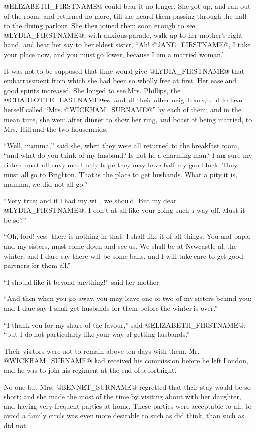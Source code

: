 @ELIZABETH_FIRSTNAME@ could bear it no longer. She got up, and ran out of the room;
and returned no more, till she heard them passing through the hall to
the dining parlour. She then joined them soon enough to see @LYDIA_FIRSTNAME@, with
anxious parade, walk up to her mother's right hand, and hear her say
to her eldest sister, ``Ah! @JANE_FIRSTNAME@, I take your place now, and you must go
lower, because I am a married woman.''

It was not to be supposed that time would give @LYDIA_FIRSTNAME@ that embarrassment
from which she had been so wholly free at first. Her ease and good
spirits increased. She longed to see Mrs. Phillips, the @CHARLOTTE_LASTNAME@es, and
all their other neighbours, and to hear herself called ``Mrs. @WICKHAM_SURNAME@''
by each of them; and in the mean time, she went after dinner to show her
ring, and boast of being married, to Mrs. Hill and the two housemaids.

``Well, mamma,'' said she, when they were all returned to the breakfast
room, ``and what do you think of my husband? Is not he a charming man? I
am sure my sisters must all envy me. I only hope they may have half
my good luck. They must all go to Brighton. That is the place to get
husbands. What a pity it is, mamma, we did not all go.''

``Very true; and if I had my will, we should. But my dear @LYDIA_FIRSTNAME@, I don't
at all like your going such a way off. Must it be so?''

``Oh, lord! yes;--there is nothing in that. I shall like it of all
things. You and papa, and my sisters, must come down and see us. We
shall be at Newcastle all the winter, and I dare say there will be some
balls, and I will take care to get good partners for them all.''

``I should like it beyond anything!'' said her mother.

``And then when you go away, you may leave one or two of my sisters
behind you; and I dare say I shall get husbands for them before the
winter is over.''

``I thank you for my share of the favour,'' said @ELIZABETH_FIRSTNAME@; ``but I do not
particularly like your way of getting husbands.''

Their visitors were not to remain above ten days with them. Mr. @WICKHAM_SURNAME@
had received his commission before he left London, and he was to join
his regiment at the end of a fortnight.

No one but Mrs. @BENNET_SURNAME@ regretted that their stay would be so short; and
she made the most of the time by visiting about with her daughter, and
having very frequent parties at home. These parties were acceptable to
all; to avoid a family circle was even more desirable to such as did
think, than such as did not.

